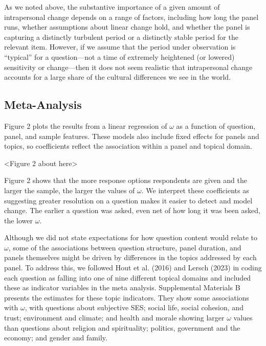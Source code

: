 \documentclass[
  12pt,
]{article}
\begin{document}
As we noted above, the substantive importance of a given amount of
intrapersonal change depends on a range of factors, including how long
the panel runs, whether assumptions about linear change hold, and
whether the panel is capturing a distinctly turbulent period or a
distinctly stable period for the relevant item. However, if we assume
that the period under observation is ``typical'' for a question---not a
time of extremely heightened (or lowered) sensitivity or change---then
it does not seem realistic that intrapersonal change accounts for a
large share of the cultural differences we see in the world.

\hypertarget{meta-analysis}{%
\subsection{Meta-Analysis}\label{meta-analysis}}

Figure 2 plots the results from a linear regression of \(\omega\) as a
function of question, panel, and sample features. These models also
include fixed effects for panels and topics, so coefficients reflect the
association within a panel and topical domain.

\begin{center}
<Figure 2 about here>
\end{center}

Figure 2 shows that the more response options respondents are given and
the larger the sample, the larger the values of \(\omega\). We interpret
these coefficients as suggesting greater resolution on a question makes
it easier to detect and model change. The earlier a question was asked,
even net of how long it was been asked, the lower \(\omega\).

Although we did not state expectations for how question content would
relate to \(\omega\), some of the associations between question
structure, panel duration, and panels themselves might be driven by
differences in the topics addressed by each panel. To address this, we
followed Hout et al. (2016) and Lersch (2023) in coding each question as
falling into one of nine different topical domains and included these as
indicator variables in the meta analysis. Supplemental Materials B
presents the estimates for these topic indicators. They show some
associations with \(\omega\), with questions about subjective SES;
social life, social cohesion, and trust; environment and climate; and
health and morale showing larger \(\omega\) values than questions about
religion and spirituality; politics, government and the economy; and
gender and family.
\end{document}
